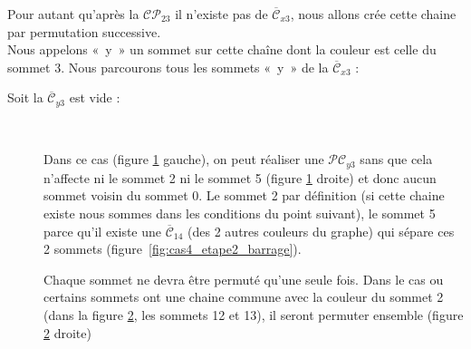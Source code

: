 \documentclass[french]{report}
\begin{document}
Pour autant qu'après la  $\mathcal{CP}_{23}$ il n'existe pas de $\overline{\mathcal{C}}_{x3}$, nous allons crée cette chaine par permutation successive.\\  

Nous appelons «~y~» un sommet sur cette chaîne dont la couleur est celle du sommet 3.
Nous parcourons tous les sommets «~y~» de la  $\overline{\mathcal{C}}_{x3}$ :
\begin{adjustwidth}{3.5em}{0pt}
	\begin{description}
		\item[Soit la $\overline{\mathcal{C}}_{y3}$ est vide :]\
		
Dans ce cas (figure \ref{fig:cas4_etape2_2} gauche),  on peut réaliser une $\mathcal{PC}_{y3}$ sans que cela n'affecte ni le sommet 2 ni le sommet 5 (figure \ref{fig:cas4_etape2_2} droite) et donc aucun sommet voisin du sommet 0.
Le sommet 2 par définition (si cette chaine existe nous sommes dans les conditions du point suivant), le sommet 5 parce qu’il existe une $\overline{\mathcal{C}}_{14}$ (des 2 autres couleurs du graphe) qui sépare ces 2 sommets (figure~\ref{fig:cas4_etape2_barrage}).
\begin{figure}[!ht]\centering
	\begin{changemargin}{0cm}{-3cm}
		\begin{center}
			
			\hspace{15pt}
			
		\end{center}
	\end{changemargin}
	\begin{changemargin}{3cm}{0cm}
	\caption{}\label{fig:cas4_etape2_2}
	\end{changemargin}
\end{figure}	
\FloatBarrier

Chaque sommet ne devra être permuté qu'une seule fois. Dans le cas ou certains sommets ont une chaine commune avec la couleur du sommet 2 (dans la figure \ref{fig:cas4_etape2_3}, les sommets 12 et 13), il seront permuter ensemble (figure \ref{fig:cas4_etape2_3} droite)
\begin{figure}[!ht]\centering
	\begin{changemargin}{0cm}{-3cm}
		\begin{center}
			
			\hspace{15pt}
			
		\end{center}
	\end{changemargin}
	\begin{changemargin}{3cm}{0cm}
	\caption{}\label{fig:cas4_etape2_3}
	\end{changemargin}
\end{figure}	
\FloatBarrier


\end{description}
\end{adjustwidth}
\end{document}
